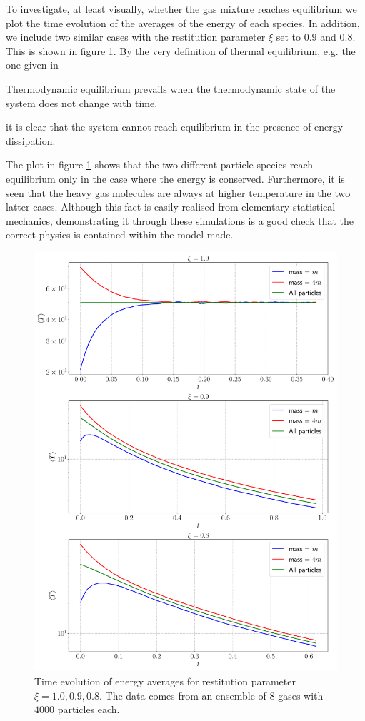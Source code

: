 To investigate, at least visually, whether the gas mixture reaches equilibrium we plot the time evolution of the averages of the energy of each species. In addition, we include two similar cases with the restitution parameter $\xi$ set to $0.9$ and $0.8$. This is shown in figure \ref{fig:averages}. By the very definition of thermal equilibrium, e.g. the one given in \cite[p.~3]{huang}

\begin{displayquote}
	Thermodynamic equilibrium prevails when the thermodynamic state of
	the system does not change with time.
\end{displayquote}
	
it is clear that the system cannot reach equilibrium in the presence of energy dissipation.

The plot in figure \ref{fig:averages} shows that the two different particle species reach equilibrium only in the case where the energy is conserved. Furthermore, it is seen that the heavy gas molecules are always at higher temperature in the two latter cases. Although this fact is easily realised from elementary statistical mechanics, demonstrating it through these simulations is a good check that the correct physics is contained within the model made. 

\begin{figure}[htb]
	\centering
	\includegraphics[width = \columnwidth]{../fig/energy_avg.pdf}
	\caption{Time evolution of energy averages for restitution parameter $\xi = 1.0,0.9,0.8$. The data comes from an ensemble of $8$ gases with $4000$ particles each.}
	\label{fig:averages}
\end{figure}

